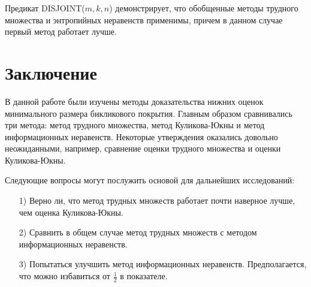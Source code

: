 \documentclass[a4paper]{article}
\begin{document}
Предикат DISJOINT($m,k,n$) демонстрирует, что обобщенные методы трудного множества и энтропийных неравенств применимы, 
причем в данном случае первый метод работает лучше. 

\addtocounter{section}{1}
\section*{Заключение}
В данной работе были изучены методы доказательства нижних оценок минимального размера бикликового покрытия. 
Главным образом сравнивались три метода: метод трудного множества, метод Куликова-Юкны и метод 
информационных неравенств. Некоторые утверждения оказались довольно неожиданными, например, сравнение 
оценки трудного множества и оценки Куликова-Юкны. 

Следующие вопросы могут послужить основой для дальнейших исследований:
\begin{itemize}[noitemsep]
    \item[1)] Верно ли, что метод трудных множеств работает почти наверное лучше, чем оценка Куликова-Юкны.
    \item[2)] Сравнить в общем случае метод трудных множеств с методом информационных неравенств.
    \item[3)] Попытаться улучшить метод информационных неравенств. Предполагается, что можно избавиться 
    от $\frac{1}{2}$ в показателе.
\end{itemize}


\newpage



\end{document}
